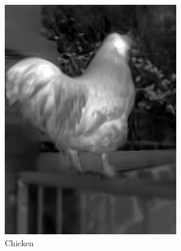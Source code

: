\documentclass{l4proj}
\begin{document}
\begin{figure}[ht]
\begin{subfigure}[h!]{0.18\textwidth}
    \includegraphics[width=\textwidth, trim={0cm 1.6cm 0cm 1.6cm}, clip]{images/dataset/chicken/lwir.png}
    \caption{Chicken}
  \end{subfigure}
  \begin{subfigure}[h!]{0.18\textwidth}

\end{subfigure}
\end{figure}
\end{document}
